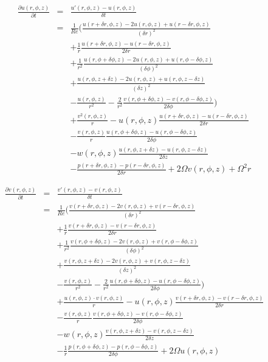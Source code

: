 \documentclass[12pt, a4paper, twoside]{article}
\begin{document}
		\begin{eqnarray}
			\frac{\partial u(r,\phi,z)}{\partial t} &=& \frac{u'(r,\phi,z)- u(r,\phi,z)}{\delta t}
			\nonumber \\
			&=& \frac{1}{Re} \bigg( \frac{u(r+\delta r,\phi,z)-2u(r,\phi,z)+u(r-\delta r,\phi,z)}{(\delta r)^2}
			\nonumber \\
							&&	+ \frac{1}{r}\frac{u(r+\delta r,\phi,z)-u(r-\delta r,\phi,z)}{2\delta r}
			\nonumber \\
							&&	+ \frac{1}{r^2}\frac{u(r,\phi+\delta\phi,z)-2u(r,\phi,z)+u(r,\phi-\delta\phi,z)}{(\delta \phi)^2}
			\nonumber \\
							&&	+ \frac{u(r,\phi,z+\delta z)-2u(r,\phi,z)+u(r,\phi,z-\delta z)}{(\delta z)^2}
			\nonumber \\
							&&	- \frac{u(r,\phi, z)}{r^2}
								- \frac{2}{r^2}\frac{v(r,\phi+\delta\phi,z)-v(r,\phi-\delta\phi,z)}{2\delta\phi} \bigg)
			\nonumber \\
			&&	+ \frac{v^2(r,\phi,z)}{r}
				- u(r,\phi,z)\frac{u(r+\delta r,\phi,z)-u(r-\delta r,\phi,z)}{2\delta r}
			\nonumber \\
			&&	- \frac{v(r,\phi,z)}{r}\frac{u(r,\phi+\delta\phi,z)-u(r,\phi-\delta\phi,z)}{2\delta\phi}
			\nonumber \\
			&&	- w(r,\phi,z)\frac{u(r,\phi,z+\delta z)-u(r,\phi,z-\delta z)}{2\delta z}
			\nonumber \\
			&&	- \frac{p(r+\delta r,\phi, z)-p(r-\delta r,\phi,z)}{2\delta r}
				+ 2\Omega v(r,\phi,z)
				+ \Omega^2 r
			\label{eq:discrete u}
		\end{eqnarray}
		
		\begin{eqnarray}
			\frac{\partial v(r,\phi,z)}{\partial t} &=& \frac{v'(r,\phi,z)- v(r,\phi,z)}{\delta t}
			\nonumber \\
			&=& \frac{1}{Re} \bigg( \frac{v(r+\delta r,\phi,z)-2v(r,\phi,z)+v(r-\delta r,\phi,z)}{(\delta r)^2}
			\nonumber \\
							&&	+ \frac{1}{r}\frac{v(r+\delta r,\phi,z)-v(r-\delta r,\phi,z)}{2\delta r}
			\nonumber \\
							&&	+ \frac{1}{r^2}\frac{v(r,\phi+\delta\phi,z)-2v(r,\phi,z)+v(r,\phi-\delta\phi,z)}{(\delta \phi)^2}
			\nonumber \\
							&&	+ \frac{v(r,\phi,z+\delta z)-2v(r,\phi,z)+v(r,\phi,z-\delta z)}{(\delta z)^2}
			\nonumber \\
							&&	- \frac{v(r,\phi, z)}{r^2}
								- \frac{2}{r^2}\frac{u(r,\phi+\delta\phi,z)-u(r,\phi-\delta\phi,z)}{2\delta\phi} \bigg)
			\nonumber \\
			&&	+ \frac{u(r,\phi,z)\cdot v(r,\phi,z)}{r}
				- u(r,\phi,z)\frac{v(r+\delta r,\phi,z)-v(r-\delta r,\phi,z)}{2\delta r}
			\nonumber \\
			&&	- \frac{v(r,\phi,z)}{r}\frac{v(r,\phi+\delta\phi,z)-v(r,\phi-\delta\phi,z)}{2\delta\phi}
			\nonumber \\
			&&	- w(r,\phi,z)\frac{v(r,\phi,z+\delta z)-v(r,\phi,z-\delta z)}{2\delta z}
			\nonumber \\
			&&	- \frac{1}{r}\frac{p(r,\phi+\delta\phi, z)-p(r,\phi-\delta\phi,z)}{2\delta \phi}
				+ 2\Omega u(r,\phi,z)
			\label{eq:discrete v}
		\end{eqnarray}
		
\end{document}
